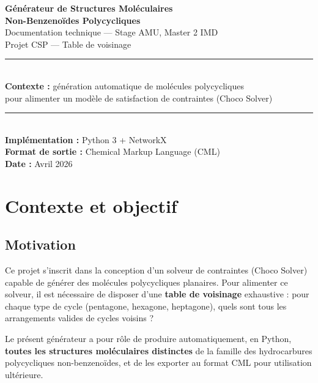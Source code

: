 \documentclass[a4paper,12pt]{article}
\begin{document}
\begin{titlepage}
  \centering
  \vspace*{2cm}
  {\huge\bfseries\color{primary}
    Générateur de Structures Moléculaires\\[0.4em]
    Non-Benzenoïdes Polycycliques\\[1em]}
  {\large\color{gray} Documentation technique — Stage AMU, Master 2 IMD}\\[0.5em]
  {\large\color{gray} Projet CSP — Table de voisinage}\\[3em]
  \rule{\linewidth}{0.5pt}\\[1em]
  {\large
    \textbf{Contexte :} génération automatique de molécules polycycliques\\
    pour alimenter un modèle de satisfaction de contraintes (Choco Solver)
  }\\[1em]
  \rule{\linewidth}{0.5pt}\\[3em]
  {\normalsize
    \textbf{Implémentation :} Python 3 + NetworkX\\[0.5em]
    \textbf{Format de sortie :} Chemical Markup Language (CML)\\[0.5em]
    \textbf{Date :} Avril 2026
  }
  \vfill
\end{titlepage}

\tableofcontents
\newpage

\section{Contexte et objectif}

\subsection{Motivation}

Ce projet s'inscrit dans la conception d'un solveur de contraintes (Choco Solver) capable de
générer des molécules polycycliques planaires. Pour alimenter ce solveur, il est nécessaire de
disposer d'une \textbf{table de voisinage} exhaustive : pour chaque type de cycle (pentagone,
hexagone, heptagone), quels sont tous les arrangements valides de cycles voisins ?

Le présent générateur a pour rôle de produire automatiquement, en Python, \textbf{toutes les
structures moléculaires distinctes} de la famille des hydrocarbures polycycliques non-benzenoïdes,
et de les exporter au format CML pour utilisation ultérieure.
\end{document}
